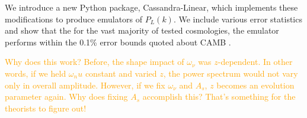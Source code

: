 We introduce a new Python package, Cassandra-Linear, which implements these
modifications to produce emulators of $P_L(k)$. We include various error 
statistics and show that the for the vast majority of tested cosmologies, the 
emulator performs within the 0.1\% error bounds quoted about 
CAMB .

\textcolor{orange}{Why does this work? Before, the shape impact of
$\omega_\nu$ 
was $z$-dependent. In other words, if we held $\omega_nu$ constant and varied
$z$, the power spectrum would not vary only in overall amplitude. However, if
we fix $\omega_\nu$ and $A_s$, $z$ becomes an evolution parameter again. Why
does fixing $A_s$ accomplish this? That's something for the theorists to 
figure out!}
